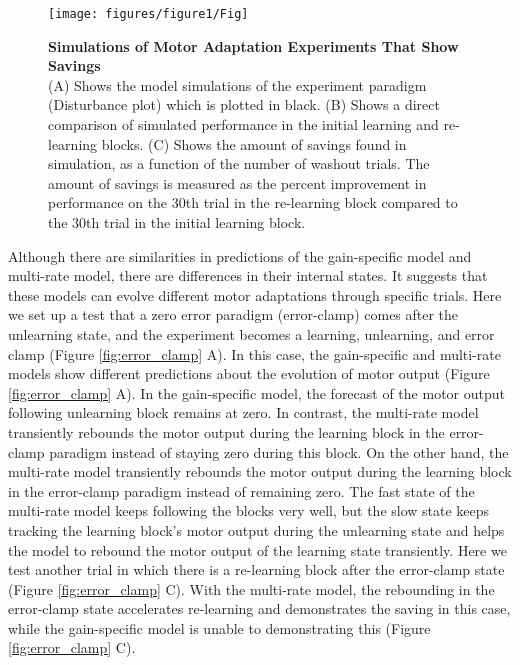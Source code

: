\documentclass[9pt,twocolumn]{paper-template}
\begin{document}
\begin{figure*}[h!]
  \centering
    \texttt{[image: figures/figure1/Fig]}
  \caption{\textbf{Simulations of Motor Adaptation Experiments That Show Savings}\\
  (A) Shows the model simulations of the experiment paradigm (Disturbance plot) which is plotted in black. (B) Shows a direct comparison of simulated performance in the initial learning and re-learning blocks.  (C) Shows the amount of savings found in simulation, as a function of the number of washout trials. The amount of savings is measured as the percent improvement in performance on the 30th trial in the re-learning block compared to the 30th trial in the initial learning block. 
}
  \label{fig:saving}
\end{figure*}


Although there are similarities in predictions of the gain-specific model and multi-rate model, there are differences in their internal states. It suggests that these models can evolve different motor adaptations through specific trials. Here we set up a test that a zero error paradigm (error-clamp) comes after the unlearning state, and the experiment becomes a learning, unlearning, and error clamp (Figure \ref{fig:error_clamp} A). In this case, the gain-specific and multi-rate models show different predictions about the evolution of motor output (Figure \ref{fig:error_clamp} A). In the gain-specific model, the forecast of the motor output following unlearning block remains at zero.
In contrast, the multi-rate model transiently rebounds the motor output during the learning block in the error-clamp paradigm instead of staying zero during this block. On the other hand, the multi-rate model transiently rebounds the motor output during the learning block in the error-clamp paradigm instead of remaining zero. The fast state of the multi-rate model keeps following the blocks very well, but the slow state keeps tracking the learning block's motor output during the unlearning state and helps the model to rebound the motor output of the learning state transiently. Here we test another trial in which there is a re-learning block after the error-clamp state (Figure \ref{fig:error_clamp} C). With the multi-rate model, the rebounding in the error-clamp state accelerates re-learning and demonstrates the saving in this case, while the gain-specific model is unable to demonstrating this (Figure \ref{fig:error_clamp} C).
\end{document}
